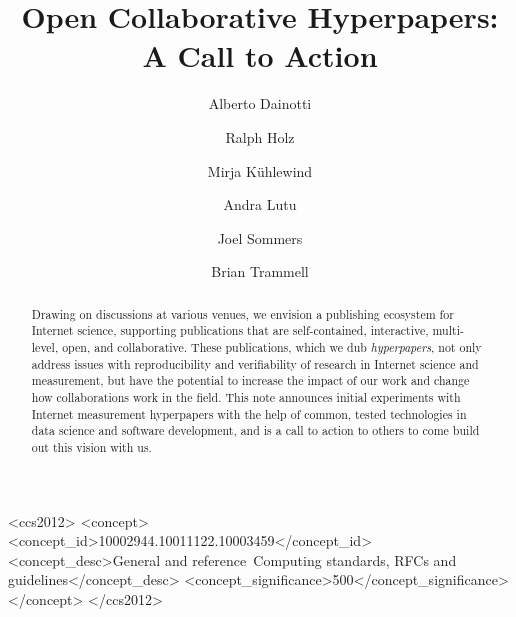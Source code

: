 \documentclass[sigconf,10pt]{acmart}
\begin{document}
\title{Open Collaborative Hyperpapers: A Call to Action}

\author{Alberto Dainotti}

\author{Ralph Holz}

\author{Mirja K\"uhlewind}

\author{Andra Lutu}

\author{Joel Sommers}

\author{Brian Trammell}


\begin{abstract}
	Drawing on discussions at various venues, we envision a publishing ecosystem
	for Internet science, supporting publications that are self-contained,
	interactive, multi-level, open, and collaborative. These publications, which
	we dub \emph{hyperpapers}, not only address issues with reproducibility and
	verifiability of research in Internet science and measurement, but have the
	potential to increase the impact of our work and change how collaborations
	work in the field. This note announces initial experiments with Internet
	measurement hyperpapers with the help of common, tested technologies in data
	science and software development, and is a call to action to others to come
	build out this vision with us.
\end{abstract}

\begin{CCSXML}
<ccs2012>
<concept>
<concept_id>10002944.10011122.10003459</concept_id>
<concept_desc>General and reference~Computing standards, RFCs and guidelines</concept_desc>
<concept_significance>500</concept_significance>
</concept>
</ccs2012>
\end{CCSXML}



\maketitle
\end{document}
